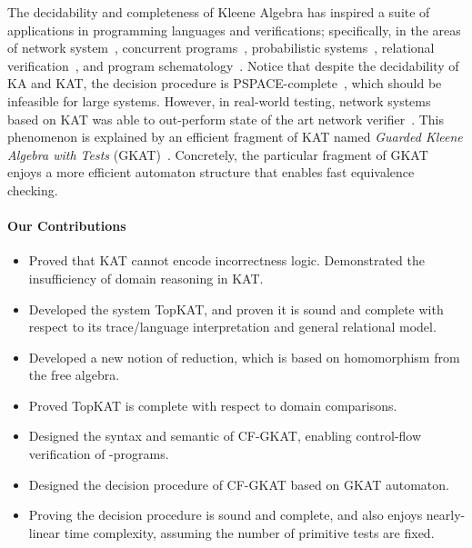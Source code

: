 The decidability and completeness of Kleene Algebra has inspired a suite of applications in programming languages and verifications; specifically, in the areas of network system~\cite{Anderson_Foster_Guha_Jeannin_Kozen_Schlesinger_Walker_2014,Foster_Kozen_Milano_Silva_Thompson_2015, Smolka_Kumar_Kahn_Foster_Hsu_Kozen_Silva_2019},
concurrent programs~\cite{hoare_ConcurrentKleeneAlgebra_2009,Kappé_Brunet_Silva_Wagemaker_Zanasi_2020,Kappé_Brunet_Silva_Zanasi_2018}, 
probabilistic systems~\cite{mciver_UsingProbabilisticKleene_2006, McIver_Rabehaja_Struth_2011}, 
relational verification~\cite{Antonopoulos_Koskinen_Le_Nagasamudram_Naumann_Ngo_2022},
and program schematology~\cite{Angus_Kozen_2001}.
Notice that despite the decidability of KA and KAT, the decision procedure is PSPACE-complete~\cite{Cohen_Kozen_Smith_1999}, which should be infeasible for large systems.
However, in real-world testing, network systems based on KAT was able to out-perform state of the art network verifier~\cite{Smolka_Kumar_Kahn_Foster_Hsu_Kozen_Silva_2019}.
This phenomenon is explained by an efficient fragment of KAT named \emph{Guarded Kleene Algebra with Tests} (GKAT)~\cite{Smolka_Foster_Hsu_Kappé_Kozen_Silva_2020}. Concretely, the particular fragment of GKAT enjoys a more efficient automaton structure that enables fast equivalence checking.

\paragraph{Our Contributions}

\begin{itemize}
    \item Proved that KAT cannot encode incorrectness logic. Demonstrated the insufficiency of domain reasoning in KAT.
    \item Developed the system TopKAT, and proven it is sound and complete with respect to its trace/language interpretation and general relational model.
    \item Developed a new notion of reduction, which is based on homomorphism from the free algebra.
    \item Proved TopKAT is complete with respect to domain comparisons.
    \item Designed the syntax and semantic of CF-GKAT, enabling control-flow verification of -programs.
    \item Designed the decision procedure of CF-GKAT based on GKAT automaton.
    \item Proving the decision procedure is sound and complete, and also enjoys nearly-linear time complexity, assuming the number of primitive tests are fixed.
\end{itemize}

